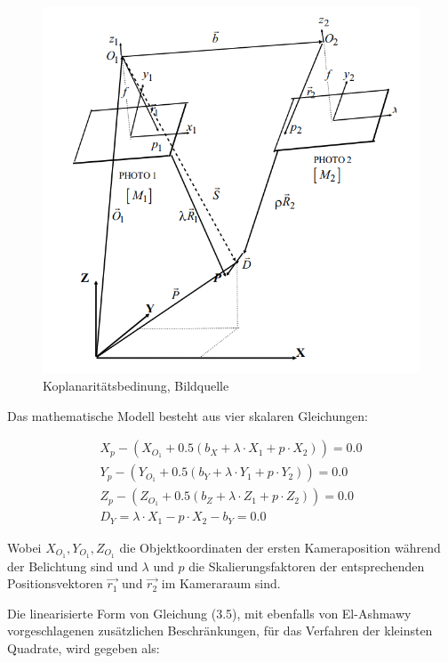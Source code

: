 \begin{figure}[H]
	\centering
	\includegraphics[scale=0.6]{coplanarity.png}
	\caption{Koplanaritätsbedinung, Bildquelle \cite{comparative_conditions_study}}
\end{figure} 

Das mathematische Modell besteht aus vier skalaren Gleichungen:

\begin{equation}
\begin{aligned}
X_p - (X_{O_1}+0.5(b_X+ \lambda \cdot X_1 + p \cdot X_2)) = 0.0 \\
Y_p - (Y_{O_1}+0.5(b_Y+ \lambda \cdot Y_1 + p \cdot Y_2)) = 0.0 \\
Z_p - (Z_{O_1}+0.5(b_Z+ \lambda \cdot Z_1 + p \cdot Z_2)) = 0.0 \\
D_Y = \lambda\cdot X_1-p\cdot X_2-b_Y = 0.0
\end{aligned}
\end{equation}

Wobei $X_{O_1}, Y_{O_1},Z_{O_1}$ die Objektkoordinaten der ersten Kameraposition während der Belichtung sind und $\lambda$ und $p$ die Skalierungsfaktoren der entsprechenden Positionsvektoren $\vec{r_1}$ und $\vec{r_2}$ im Kameraraum sind. 

Die linearisierte Form von Gleichung (3.5), mit ebenfalls von El-Ashmawy \cite{comparative_conditions_study} vorgeschlagenen zusätzlichen Beschränkungen, für das Verfahren der kleinsten Quadrate, wird gegeben als:

